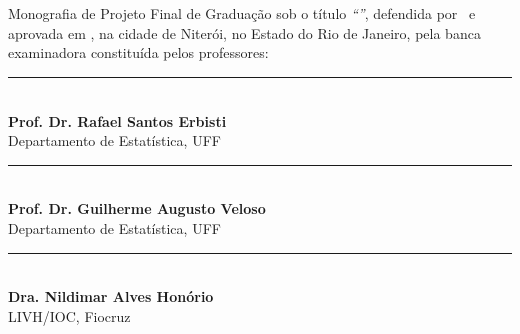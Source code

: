 \documentclass[12pt,a4paper,header]{abnt}
\begin{document}
\begin{folhadeaprovacao}

\thispagestyle{logouff}

\hspace{.2\textwidth} %
\begin{minipage}{.7\textwidth}

\begin{flushright}

{\large \bf \ABNTautordata}\\[1cm]

{\large \bf \ABNTtitulodata}\\[1cm]

\end{flushright}
Monografia de Projeto Final de Graduação sob o título \textit{``\ABNTtitulodata''},
defendida por \ABNTautordata~e aprovada em \ABNTdatadata, na cidade de Niterói,
no Estado do Rio de Janeiro, pela banca examinadora constituída pelos
professores:
\begin{flushright}

\begin{espacosimples}


\vspace{1.5cm}
\noindent\rule{10cm}{0.4pt}\\
{\bf Prof. Dr. Rafael Santos Erbisti}\\
Departamento de Estatística, UFF\\



\vspace{1.5cm}
\noindent\rule{10cm}{0.4pt}\\
{\bf Prof. Dr. Guilherme Augusto Veloso}\\
Departamento de Estatística, UFF \\

\vspace{1.5cm}
\noindent\rule{10cm}{0.4pt}\\
{\bf Dra. Nildimar Alves Honório}\\
LIVH/IOC, Fiocruz \\


\end{espacosimples}
\end{flushright}
\end{minipage}
\end{folhadeaprovacao}
\end{document}
